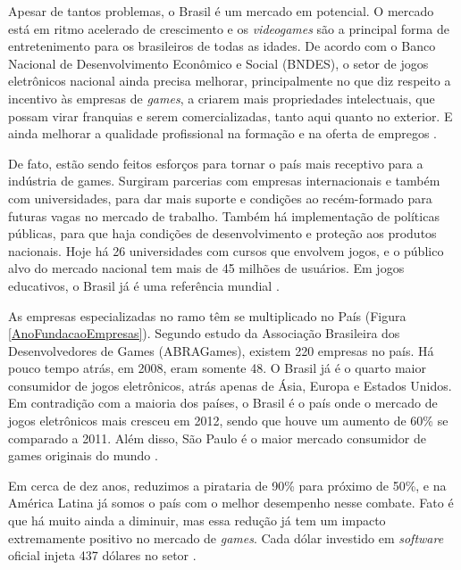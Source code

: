 %
%
Apesar de tantos problemas, o Brasil é um mercado em potencial. O mercado está em ritmo acelerado de crescimento e os \textit{videogames} são a principal forma de entretenimento para os brasileiros de todas as idades. De acordo com o Banco Nacional de Desenvolvimento Econômico e Social (BNDES), o setor de jogos eletrônicos nacional ainda precisa melhorar, principalmente no que diz respeito a incentivo às empresas de \textit{games}, a criarem mais propriedades intelectuais, que possam virar franquias e serem comercializadas, tanto aqui quanto no exterior. E ainda melhorar a qualidade profissional na formação e na oferta de empregos \cite{GEDIGames}.
\par
De fato, estão sendo feitos esforços para tornar o país mais receptivo para a indústria de games. Surgiram parcerias com empresas internacionais e também com universidades, para dar mais suporte e condições ao recém-formado para futuras vagas no mercado de trabalho. Também há implementação de políticas públicas, para que haja condições de desenvolvimento e proteção aos produtos nacionais. Hoje há 26 universidades com cursos que envolvem jogos, e o público alvo do mercado nacional tem mais de 45 milhões de usuários. Em jogos educativos, o Brasil já é uma referência mundial \cite{GEDIGames}.

As empresas especializadas no ramo têm se multiplicado no País (Figura \ref{AnoFundacaoEmpresas}). Segundo estudo da Associação Brasileira dos Desenvolvedores de Games (ABRAGames), existem 220 empresas no país. Há pouco tempo atrás, em 2008, eram somente 48. O Brasil já é o quarto maior consumidor de jogos eletrônicos, atrás apenas de Ásia, Europa e Estados Unidos. Em contradição com a maioria dos países, o Brasil é o país onde o mercado de jogos eletrônicos mais cresceu em 2012, sendo que houve um aumento de 60\% se comparado a 2011. Além disso, São Paulo é o maior mercado consumidor de games originais do mundo \cite{GEDIGames}.

Em cerca de dez anos, reduzimos a pirataria de 90\% para próximo de 50\%, e na América Latina já somos o país com o melhor desempenho nesse combate. Fato é que há muito ainda a diminuir, mas essa redução já tem um impacto extremamente positivo no mercado de \textit{games}. Cada dólar investido em \textit{software} oficial injeta 437 dólares no setor \cite{GEDIGames}.

